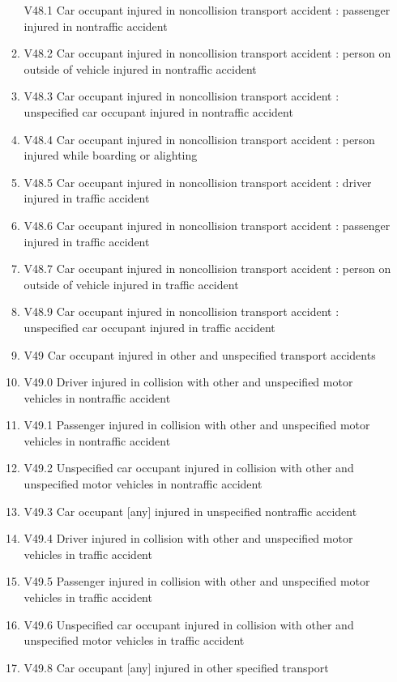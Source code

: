 \documentclass[
]{scrartcl}
\begin{document}
\begin{itemize}
\begin{enumerate}
    V48.1 Car occupant injured in noncollision transport accident :
    passenger injured in nontraffic accident
  \item
    V48.2 Car occupant injured in noncollision transport accident :
    person on outside of vehicle injured in nontraffic accident
  \item
    V48.3 Car occupant injured in noncollision transport accident :
    unspecified car occupant injured in nontraffic accident
  \item
    V48.4 Car occupant injured in noncollision transport accident :
    person injured while boarding or alighting
  \item
    V48.5 Car occupant injured in noncollision transport accident :
    driver injured in traffic accident
  \item
    V48.6 Car occupant injured in noncollision transport accident :
    passenger injured in traffic accident
  \item
    V48.7 Car occupant injured in noncollision transport accident :
    person on outside of vehicle injured in traffic accident
  \item
    V48.9 Car occupant injured in noncollision transport accident :
    unspecified car occupant injured in traffic accident
  \item
    V49 Car occupant injured in other and unspecified transport
    accidents
  \item
    V49.0 Driver injured in collision with other and unspecified motor
    vehicles in nontraffic accident
  \item
    V49.1 Passenger injured in collision with other and unspecified
    motor vehicles in nontraffic accident
  \item
    V49.2 Unspecified car occupant injured in collision with other and
    unspecified motor vehicles in nontraffic accident
  \item
    V49.3 Car occupant {[}any{]} injured in unspecified nontraffic
    accident
  \item
    V49.4 Driver injured in collision with other and unspecified motor
    vehicles in traffic accident
  \item
    V49.5 Passenger injured in collision with other and unspecified
    motor vehicles in traffic accident
  \item
    V49.6 Unspecified car occupant injured in collision with other and
    unspecified motor vehicles in traffic accident
  \item
    V49.8 Car occupant {[}any{]} injured in other specified transport

\end{enumerate}
\end{itemize}
\end{document}
